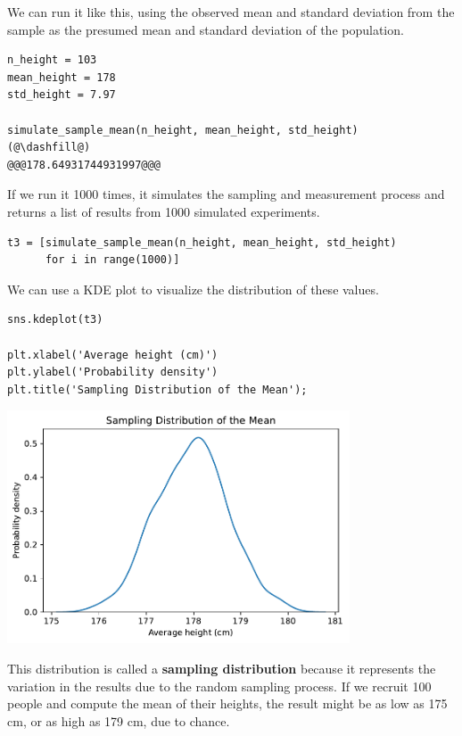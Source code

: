 We can run it like this, using the observed mean and standard deviation
from the sample as the presumed mean and standard deviation of the
population.

\begin{lstlisting}[]
n_height = 103
mean_height = 178
std_height = 7.97

simulate_sample_mean(n_height, mean_height, std_height)
(@\dashfill@)
@@@178.64931744931997@@@
\end{lstlisting}

If we run it 1000 times, it simulates the sampling and measurement
process and returns a list of results from 1000 simulated experiments.

\begin{lstlisting}[]
t3 = [simulate_sample_mean(n_height, mean_height, std_height)
      for i in range(1000)]
\end{lstlisting}

We can use a KDE plot to visualize the distribution of these values.

\begin{lstlisting}[]
sns.kdeplot(t3)

plt.xlabel('Average height (cm)')
plt.ylabel('Probability density')
plt.title('Sampling Distribution of the Mean');
\end{lstlisting}

\begin{center}
\includegraphics[width=4in]{chapters/11_resampling_files/11_resampling_59_0.pdf}
\end{center}

This distribution is called a \textbf{sampling distribution} because it
represents the variation in the results due to the random sampling
process. If we recruit 100 people and compute the mean of their heights,
the result might be as low as 175 cm, or as high as 179 cm, due to
chance.

